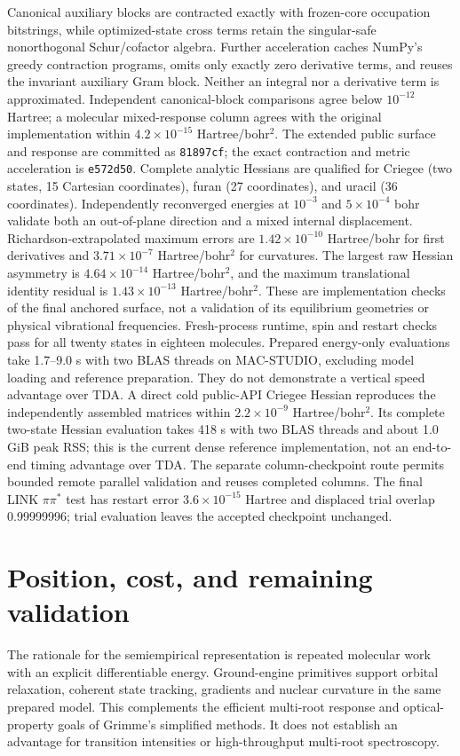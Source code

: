 \documentclass[11pt,a4paper]{article}
\begin{document}
Canonical auxiliary blocks are contracted exactly with frozen-core occupation
bitstrings, while optimized-state cross terms retain the singular-safe
nonorthogonal Schur/cofactor algebra. Further acceleration caches NumPy's
greedy contraction programs, omits only exactly zero derivative terms, and
reuses the invariant auxiliary Gram block. Neither an integral nor a derivative
term is approximated. Independent canonical-block comparisons agree below
$10^{-12}$ Hartree; a molecular mixed-response column agrees with the original
implementation within $4.2\times10^{-15}$ Hartree/bohr$^2$.
The extended public surface and response are committed as \texttt{81897cf};
the exact contraction and metric acceleration is \texttt{e572d50}.
Complete analytic Hessians are qualified for Criegee (two states,
15 Cartesian coordinates), furan (27 coordinates), and uracil (36 coordinates).
Independently reconverged energies at $10^{-3}$ and $5\times10^{-4}$ bohr
validate both an out-of-plane direction and a mixed internal displacement.
Richardson-extrapolated maximum errors are $1.42\times10^{-10}$ Hartree/bohr for
first derivatives and $3.71\times10^{-7}$ Hartree/bohr$^2$ for curvatures.
The largest raw Hessian asymmetry is $4.64\times10^{-14}$ Hartree/bohr$^2$, and the
maximum translational identity residual is $1.43\times10^{-13}$ Hartree/bohr$^2$.
These are implementation checks of the final anchored surface, not a
validation of its equilibrium geometries or physical vibrational frequencies.
Fresh-process runtime, spin and restart checks pass for all twenty states
in eighteen molecules. Prepared energy-only evaluations take 1.7--9.0 s
with two BLAS threads on MAC-STUDIO, excluding model loading and reference
preparation. They do not demonstrate a vertical speed advantage over TDA.
A direct cold public-API Criegee Hessian reproduces the independently
assembled matrices within $2.2\times10^{-9}$ Hartree/bohr$^2$.
Its complete two-state Hessian evaluation takes 418 s with two BLAS threads
and about 1.0 GiB peak RSS; this is the current dense reference implementation,
not an end-to-end timing advantage over TDA. The separate column-checkpoint
route permits bounded remote parallel validation and reuses completed columns.
The final LINK $\pi\pi^*$ test has restart error
$3.6\times10^{-15}$ Hartree and displaced trial overlap 0.99999996;
trial evaluation leaves the accepted checkpoint unchanged.



\section{Position, cost, and remaining validation}
The rationale for the semiempirical representation is repeated molecular
work with an explicit differentiable energy. Ground-engine primitives
support orbital relaxation, coherent state tracking, gradients and nuclear
curvature in the same prepared model. This complements the efficient
multi-root response and optical-property goals of Grimme's simplified
methods.\cite{tda,stdaxtb2016,std22026} It does not establish an advantage
for transition intensities or high-throughput multi-root spectroscopy.
\end{document}
